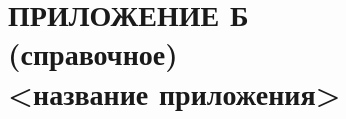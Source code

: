 \renewcommand{\thefigure}{\Asbuk{section}.\arabic{figure}}
\renewcommand{\thetable}{\Asbuk{section}.\arabic{table}}
\renewcommand{\thelstlisting}{\Asbuk{section}.\arabic{lstlisting}}

\section*{ПРИЛОЖЕНИЕ Б \\ (справочное) \\ <название приложения>}

\setcounter{section}{1}
\setcounter{figure}{0}
\setcounter{table}{0}
\setcounter{lstlisting}{0}

\pagebreak
